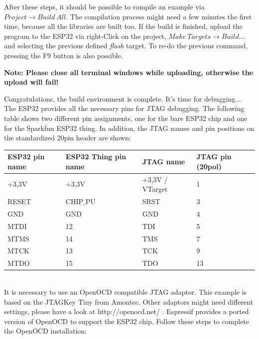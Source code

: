 \documentclass[]{scrreprt}%
\begin{document}
After these steps, it should be possible to compile an example via $Project \rightarrow Build\ All$. The compilation process might need a few minutes the first time, because all the libraries
are built too. If the build is finished, upload the program to the ESP32 via right-Click on the project, $Make\ Targets \rightarrow Build...$ and selecting the previous defined \textit{flash} target.
To re-do the previous command, pressing the F9 button is also possible.

\textbf{Note: Please close all terminal windows while uploading, otherwise the upload will fail!}

Congratulations, the build environment is complete. It's time for debugging...
\\

The ESP32 provides all the necessary pins for JTAG debugging. The following table shows two different pin assignments, one for the bare ESP32 chip and one for
the Sparkfun ESP32 thing. In addition, the JTAG names and pin positions on the standardized 20pin header are shown: \hfill \\

\begin{tabular}{|l|l|l|l|}
\hline
\textbf{ESP32 pin name}	& \textbf{ESP32 Thing pin name} & \textbf{JTAG name} 	& \textbf{JTAG pin (20pol)} \\ \hline \hline

+3,3V			& +3,3V				& +3,3V / VTarget	& 1 \\ \hline
RESET			& CHIP$\_$PU			& SRST			& 3 \\ \hline
GND			& GND				& GND			& 4 \\ \hline
MTDI			& 12				& TDI			& 5 \\ \hline
MTMS			& 14				& TMS			& 7 \\ \hline
MTCK			& 13				& TCK			& 9 \\ \hline
MTDO			& 15				& TDO			& 13 \\ \hline
\end{tabular}
\hfill \\

It is necessary to use an OpenOCD compatible JTAG adaptor. This example is based on the JTAGKey Tiny from Amontec. Other adaptors might need different settings, please have a look at http://openocd.net/ .
Espressif provides a ported version of OpenOCD to support the ESP32 chip. Follow these steps to complete the OpenOCD installation:
\end{document}
